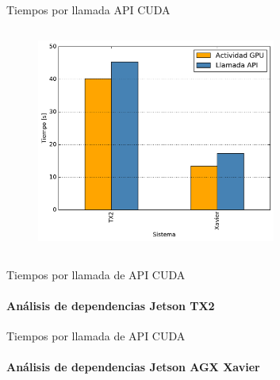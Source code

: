\begin{frame}{Tiempos por llamada API CUDA}
\begin{columns}
	\begin{figure}[H]
	\centering
 \includegraphics[width=0.7\textwidth]{barplot/gpu-act.pdf}
	\end{figure}
	\end{columns}
\end{frame}
 
\begin{frame}{Tiempos por llamada de API CUDA}
\framesubtitle{Análisis de dependencias Jetson TX2}
\resizebox{\linewidth}{!}{

}
\end{frame}


\begin{frame}{Tiempos por llamada de API CUDA}
\framesubtitle{Análisis de dependencias Jetson AGX Xavier}
\resizebox{\linewidth}{!}{

}
\end{frame}


